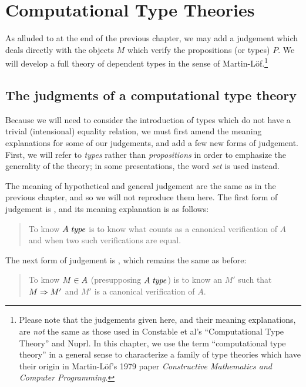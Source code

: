 \documentclass[main.tex]{subfiles}
\begin{document}
\onehalfspacing

\chapter{Computational Type Theories}

As alluded to at the end of the previous chapter, we may add a judgement
 which deals directly with the objects $M$ which verify the
propositions (or types) $P$. We will develop a full theory of dependent types
in the sense of Martin-L\"of.\footnote{Please note that the judgements given here, and
their meaning explanations, are \emph{not} the same as those used in Constable
et al's ``Computational Type Theory'' and Nuprl. In this chapter, we use the
term ``computational type theory'' in a general sense to characterize a family
of type theories which have their origin in Martin-L\"of's 1979 paper
\emph{Constructive Mathematics and Computer Programming}.}

\section{The judgments of a computational type theory}

Because we will need to consider the introduction of types which do not have a
trivial (intensional) equality relation, we must first amend the meaning
explanations for some of our judgements, and add a few new forms of judgement.
First, we will refer to \emph{types} rather than \emph{propositions} in order
to emphasize the generality of the theory; in some presentations, the word
\emph{set} is used instead.

The meaning of hypothetical and general judgement are the same as in
the previous chapter, and so we will not reproduce them here. The
first form of judgement is , and its meaning
explanation is as follows:

\begin{quote}
  To know $A\;\mathit{type}$ is to know what counts as a canonical verification of $A$
  and when two such verifications are equal.
\end{quote}

The next form of judgement is , which remains
the same as before:

\begin{quote}
  To know $M\in A$ (presupposing $A\;\mathit{type}$) is to know an $M'$ such that
  $M\Rightarrow M'$ and $M'$ is a canonical verification of $A$.
\end{quote}
\end{document}
